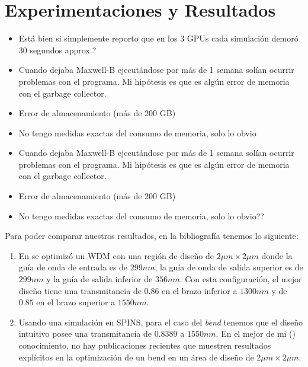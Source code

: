 \chapter{Experimentaciones y Resultados}



\begin{itemize}

  \item Está bien si simplemente reporto que en los 3 GPUs cada simulación demoró 30 segundos approx.?
  \item Cuando dejaba Maxwell-B ejecutándose por más de 1 semana solían ocurrir problemas con el programa.
        Mi hipótesis es que es algún error de memoria con el garbage collector.
  \item Error de almacenamiento (más de 200 GB)
  \item No tengo medidas exactas del consumo de memoria, solo lo obvio
  \item Cuando dejaba Maxwell-B ejecutándose por más de 1 semana solían ocurrir problemas con el programa.
        Mi hipótesis es que es algún error de memoria con el garbage collector.
  \item Error de almacenamiento (más de 200 GB)
  \item No tengo medidas exactas del consumo de memoria, solo lo obvio??
\end{itemize}

Para poder comparar nuestros resultados, en la bibliografía tenemos lo siguiente:

\begin{enumerate}

  \item En \cite{Christiansen2021} se optimizó un WDM con una región de diseño de 
        $2 \mu m \times 2 \mu m$ donde la guía de onda de entrada es de $299 nm$,
        la guía de onda de salida superior es de $299 nm$ y la guía de salida inferior de $356 nm$.
        Con esta configuración, el mejor diseño tiene una transmitancia de $0.86$ en el brazo inferior
        a $1300 nm$ y de $0.85$ en el brazo superior a $1550 nm$.

  \item Usando una simulación en SPINS, para el caso del \emph{bend} tenemos que el diseño intuitivo
        posee una transmitancia de $0.8389$ a $1550 nm$.
        En el mejor de mi () conocimiento, 
        no hay publicaciones recientes que muestren resultados
        explícitos en la optimización de un bend en un área de diseño de $2 \mu m \times 2 \mu m$.

\end{enumerate}

